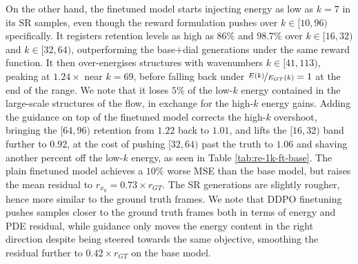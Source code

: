 On the other hand, the finetuned model starts injecting energy as low as $k=7$ in its SR
samples, even though the reward formulation pushes over $k\in[10,96)$ specifically. It
registers retention levels as high as $86\%$ and $98.7\%$ over $k\in[16,32)$ and
$k\in[32,64)$, outperforming the base$+$dial generations under the same reward function.
It then over-energises structures with wavenumbers $k\in[41,113)$, peaking at
$1.24\times$ near $k=69$, before falling back under $\nicefrac{E(k)}{E_{GT}(k)}=1$ at
the end of the range. We note that it loses $5\%$ of the low-$k$ energy contained in the
large-scale structures of the flow, in exchange for the high-$k$ energy gains. Adding
the guidance on top of the finetuned model corrects the high-$k$ overshoot, bringing the
$[64,96)$ retention from $1.22$ back to $1.01$, and lifts the $[16,32)$ band further to
$0.92$, at the cost of pushing $[32,64)$ past the truth to $1.06$ and shaving another
percent off the low-$k$ energy, as seen in Table \ref{tab:re-1k-ft-base}. The plain
finetuned model achieves a $10\%$ worse MSE than the base model, but raises the mean
residual to $r_{x_0}=0.73\times r_{GT}$. The SR generations are slightly rougher, hence
more similar to the ground truth frames. We note that DDPO finetuning pushes samples
closer to the ground truth frames both in terms of energy and PDE residual, while
guidance only moves the energy content in the right direction despite being steered
towards the same objective, smoothing the residual further to $0.42\times r_{GT}$ on the
base model.\newline
